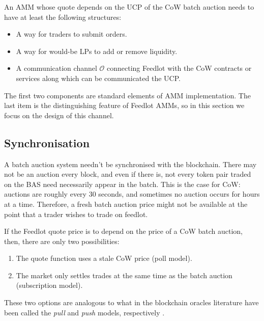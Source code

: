 \documentclass[a4paper,10pt]{article}
\theoremstyle{remark}
\begin{document}
%
An AMM whose quote depends on the UCP of the CoW batch auction needs to have at least the following structures:
\begin{itemize}
  \item A way for traders to submit orders.
  \item A way for would-be LPs to add or remove liquidity.
  \item A communication channel $\mathcal{O}$ connecting Feedlot with the CoW contracts or services along which can be communicated the UCP.
\end{itemize}
The first two components are standard elements of AMM implementation. 
%
The last item is the distinguishing feature of Feedlot AMMs, so in this section we focus on the design of this channel.

\subsection{Synchronisation}

A batch auction system needn't be synchronised with the blockchain.
%
There may not be an auction every block, and even if there is, not every token pair traded on the BAS need necessarily appear in the batch.
%
This is the case for CoW: auctions are roughly every 30 seconds, and sometimes no auction occurs for hours at a time.
%
Therefore, a fresh batch auction price might not be available at the point that a trader wishes to trade on feedlot.

If the Feedlot quote price is to depend on the price of a CoW batch auction, then, there are only two possibilities:
\begin{enumerate}
  \item The quote function uses a stale CoW price (poll model).
  \item The market only settles trades at the same time as the batch auction (subscription model).
\end{enumerate}
These two options are analogous to what in the blockchain oracles literature have been called the \emph{pull} and \emph{push} models, respectively \cite{heiss2019oracles,muhlberger2020foundational}.
\end{document}
